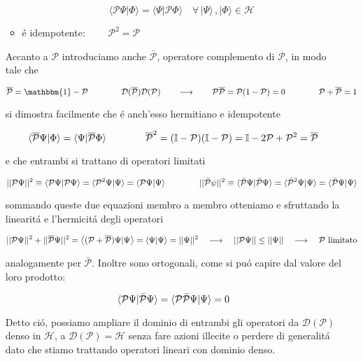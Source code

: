 \begin{enumerate}
\begin{itemize}
$$\langle{\mathcal{P}}\Psi|\Phi\rangle=\langle\Psi|{\mathcal{P}}\Phi\rangle\quad\forall\,|\Psi\rangle\,,|\Phi\rangle\in{\mathcal{H}}$$

\item \'e idempotente: $\qquad \mathcal{P}^2 = \mathcal{P}$
\end{itemize}

Accanto a $\mathcal{P}$ introduciamo anche $\bar{\mathcal{P}}$, operatore complemento di $\mathcal{P}$, in modo tale che

$${\overline{{\mathcal{P}}}}=\mathbbm{1}-{\mathcal{P}} \qquad\qquad \mathcal{D}(\overline{\mathcal{P}}) \mathcal{D}({\mathcal{P}})\qquad\longrightarrow\qquad {\mathcal{P}}{\overline{{{\mathcal{P}}}}}={\mathcal{P}}(1-{\mathcal{P}})=0 \qquad\qquad
{\mathcal{P}}+{\overline{{{\mathcal{P}}}}}=1$$

si dimostra facilmente che \'e anch'esso hermitiano e idempotente 

$$\langle\overline{{{\cal P}}}\Psi|\Phi\rangle=\langle\Psi|\overline{{{\cal P}}}\Phi\rangle \qquad\qquad
{\overline{{{\mathcal{P}}}}}^{2}=(\mathbb{I}-{\mathcal{P}})(\mathbb{I}-{\mathcal{P}})=\mathbb{I}-2{\mathcal{P}}+{\mathcal{P}}^{2}={\overline{{{\mathcal{P}}}}}$$

e che entrambi si trattano di operatori limitati

$$||\mathcal{P} \Psi||^2 \equiv \normalsize\langle \mathcal{P} \Psi \normalsize| \mathcal{P} \Psi \normalsize\rangle = \normalsize\langle \mathcal{P}^2 \Psi \normalsize| \Psi \normalsize\rangle = \normalsize\langle \mathcal{P} \Psi \normalsize| \Psi \normalsize\rangle \qquad\qquad 
||\bar{\mathcal{P}} \psi||^2 \equiv \normalsize\langle \bar{\mathcal{P}} \Psi \normalsize| \bar{\mathcal{P}} \Psi \normalsize\rangle = \normalsize\langle \bar{\mathcal{P}}^2 \Psi \normalsize| \Psi \normalsize\rangle = \normalsize\langle \bar{\mathcal{P}} \Psi \normalsize| \Psi \normalsize\rangle $$

sommando queste due equazioni membro a membro otteniamo e sfruttando la linearit\'a e l'hermicit\'a degli operatori

$$||{\cal P}\Psi||^{2}+||\overline{{\cal P}}\Psi||^{2}=\left\langle({\cal P}+\overline{{\cal P}})\Psi|\Psi\right\rangle=\left\langle\Psi|\Psi\right\rangle=||\Psi||^{2}\quad\longrightarrow\quad||{\cal P}\Psi||\leq||\Psi||\quad\longrightarrow\quad\mathcal{P}\text{ limitato}$$

analogamente per $\bar{\mathcal{P}}$. Inoltre sono ortogonali, come si pu\'o capire dal valore del loro prodotto:

$$\normalsize\langle \mathcal{P}\Psi \normalsize| \bar{\mathcal{P}}\Psi \normalsize\rangle = \normalsize\langle \mathcal{P}\bar{\mathcal{P}}\Psi \normalsize| \Psi \normalsize\rangle = 0$$

Detto ci\'o, possiamo ampliare il dominio di entrambi gli operatori da $\mathcal{D}(\mathcal{P})$ denso in $\mathcal{H}$, a $\mathcal{D}(\mathcal{P}) = \mathcal{H}$ senza fare azioni illecite o perdere di generalit\'a dato che stiamo trattando operatori lineari con dominio denso.


\end{enumerate}
